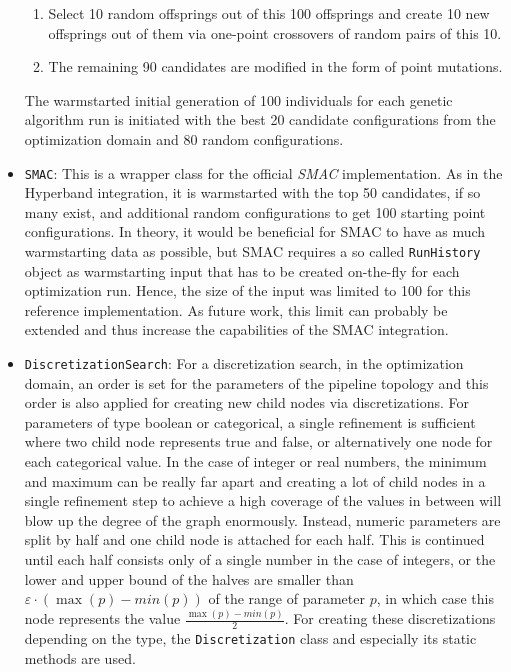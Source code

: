 \begin{itemize}
\begin{enumerate}
            \item Select 10 random offsprings out of this 100 offsprings and create 10 new offsprings out of them via one-point crossovers of random pairs of this 10.
            \item The remaining 90 candidates are modified in the form of point mutations.
        \end{enumerate}
    The warmstarted initial generation of 100 individuals for each genetic algorithm run is initiated with the best 20 candidate configurations from the optimization domain and 80 random configurations.
    \item \texttt{SMAC}: This is a wrapper class for the official \textit{SMAC} implementation.
    As in the Hyperband integration, it is warmstarted with the top 50 candidates, if so many exist, and additional random configurations to get 100 starting point configurations.
    In theory, it would be beneficial for SMAC to have as much warmstarting data as possible, but SMAC requires a so called \texttt{RunHistory} object as warmstarting input that has to be created on-the-fly for each optimization run.
    Hence, the size of the input was limited to 100 for this reference implementation.
    As future work, this limit can probably be extended and thus increase the capabilities of the SMAC integration.
    \item \texttt{DiscretizationSearch}: For a discretization search, in the optimization domain, an order is set for the parameters of the pipeline topology and this order is also applied for creating new child nodes via discretizations.\newline
    For parameters of type boolean or categorical, a single refinement is sufficient where two child node represents true and false, or alternatively one node for each categorical value.
    In the case of integer or real numbers, the minimum and maximum can be really far apart and creating a lot of child nodes in a single refinement step to achieve a high coverage of the values in between will blow up the degree of the graph enormously.
    Instead, numeric parameters are split by half and one child node is attached for each half.
    This is continued until each half consists only of a single number in the case of integers, or the lower and upper bound of the halves are smaller than $\varepsilon \cdot (\max(p) - min(p))$ of the range of parameter $p$, in which case this node represents the value $\frac{\max(p) - min(p)}{2}$.\newline
    For creating these discretizations depending on the type, the \texttt{Discretization} class and especially its static methods are used.

\end{itemize}
